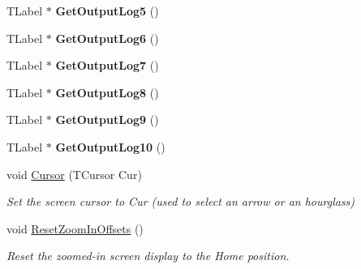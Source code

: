 \begin{DoxyCompactItemize}
\item 
\mbox{\label{class_t_display_a890f6524c617a499ddf6a33dedd402d5}} 
T\+Label $\ast$ {\bfseries Get\+Output\+Log5} ()
\item 
\mbox{\label{class_t_display_a6195645236a8467bb91251ebc05e7aaa}} 
T\+Label $\ast$ {\bfseries Get\+Output\+Log6} ()
\item 
\mbox{\label{class_t_display_abd6048be9875c6a05d5e03dafad392eb}} 
T\+Label $\ast$ {\bfseries Get\+Output\+Log7} ()
\item 
\mbox{\label{class_t_display_a6b64227ebcf1e3d89ab7b91935b34418}} 
T\+Label $\ast$ {\bfseries Get\+Output\+Log8} ()
\item 
\mbox{\label{class_t_display_a3c0d9e395bca910692d99bf290003a82}} 
T\+Label $\ast$ {\bfseries Get\+Output\+Log9} ()
\item 
\mbox{\label{class_t_display_af3539f02f6a316b418aa5536cf52649c}} 
T\+Label $\ast$ {\bfseries Get\+Output\+Log10} ()
\item 
\mbox{\label{class_t_display_abf4de4c2478e8e9d29316fa0e2b6cf8c}} 
void \mbox{\hyperlink{class_t_display_abf4de4c2478e8e9d29316fa0e2b6cf8c}{Cursor}} (T\+Cursor Cur)
\begin{DoxyCompactList}\small\item\em Set the screen cursor to \textquotesingle{}Cur\textquotesingle{} (used to select an arrow or an hourglass) \end{DoxyCompactList}\item 
\mbox{\label{class_t_display_adc2d6f29794735d5fdebd7b2dbece95d}} 
void \mbox{\hyperlink{class_t_display_adc2d6f29794735d5fdebd7b2dbece95d}{Reset\+Zoom\+In\+Offsets}} ()
\begin{DoxyCompactList}\small\item\em Reset the zoomed-\/in screen display to the \textquotesingle{}Home\textquotesingle{} position. \end{DoxyCompactList}\item 
\mbox{\label{class_t_display_aae6570b04021b9a6e1748eb7f2bdf325}} 

\end{DoxyCompactItemize}
